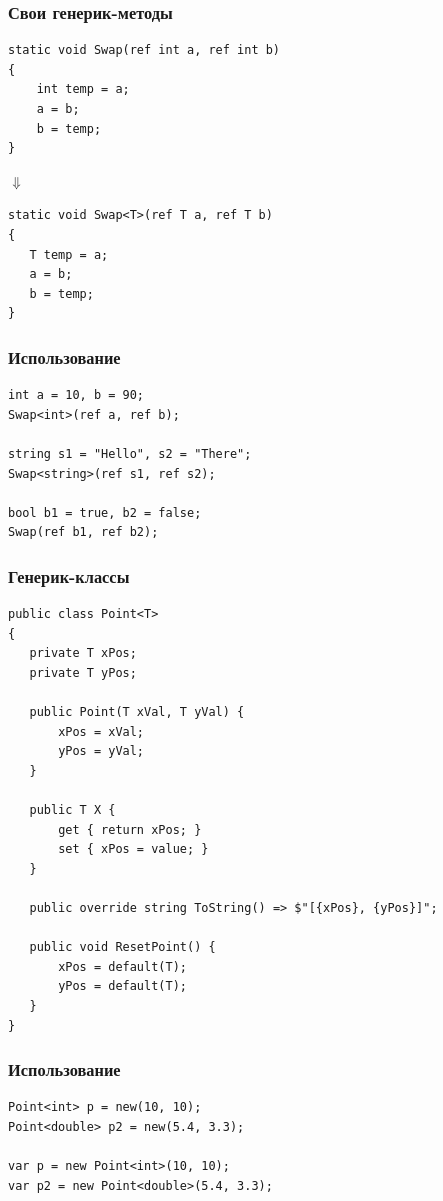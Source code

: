 \documentclass{../../slides-style}
\begin{document}
    \begin{frame}[fragile]
        \frametitle{Свои генерик-методы}
        \begin{verbatim}
static void Swap(ref int a, ref int b)
{
    int temp = a;
    a = b;
    b = temp;
}
        \end{verbatim}
        \hspace{2cm} $\Downarrow$
        \begin{verbatim}
static void Swap<T>(ref T a, ref T b)
{
   T temp = a;
   a = b;
   b = temp;
}
        \end{verbatim}
    \end{frame}

    \begin{frame}[fragile]
        \frametitle{Использование}
        \begin{verbatim}
int a = 10, b = 90;
Swap<int>(ref a, ref b);

string s1 = "Hello", s2 = "There";
Swap<string>(ref s1, ref s2);

bool b1 = true, b2 = false;
Swap(ref b1, ref b2);
        \end{verbatim}
    \end{frame}

    \begin{frame}[fragile]
        \frametitle{Генерик-классы}
        \begin{scriptsize}
            \begin{verbatim}
public class Point<T>
{
   private T xPos;
   private T yPos;

   public Point(T xVal, T yVal) {
       xPos = xVal;
       yPos = yVal;
   }
   
   public T X {
       get { return xPos; }
       set { xPos = value; }
   }

   public override string ToString() => $"[{xPos}, {yPos}]";

   public void ResetPoint() {
       xPos = default(T);
       yPos = default(T);
   }
}
            \end{verbatim}
        \end{scriptsize}
    \end{frame}

    \begin{frame}[fragile]
        \frametitle{Использование}
        \begin{verbatim}
Point<int> p = new(10, 10);
Point<double> p2 = new(5.4, 3.3);

var p = new Point<int>(10, 10);
var p2 = new Point<double>(5.4, 3.3);
        \end{verbatim}
    \end{frame}
\end{document}
